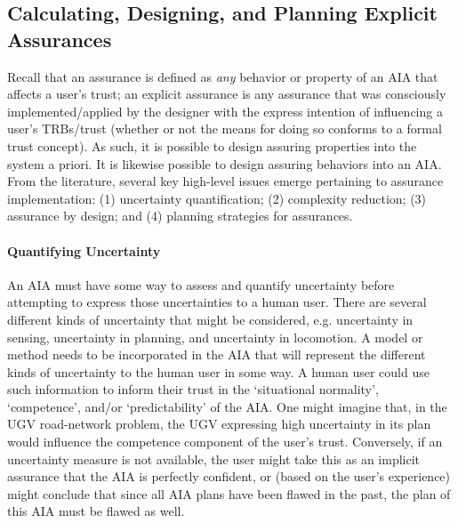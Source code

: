 \subsection{Calculating, Designing, and Planning Explicit Assurances}
    Recall that an assurance is defined as \emph{any} behavior or property of an AIA that affects a user's trust; an explicit assurance is any assurance that was consciously implemented/applied by the designer with the express intention of influencing a user's TRBs/trust (whether or not the means for doing so conforms to a formal trust concept). As such, it is possible to design assuring properties into the system a priori. It is likewise possible to design assuring behaviors into an AIA. From the literature, several key high-level issues emerge pertaining to assurance implementation: (1) uncertainty quantification; (2) complexity reduction; (3) assurance by design; and (4) planning strategies for assurances. 


    \paragraph{Quantifying Uncertainty} %
An AIA must have some way to assess and quantify uncertainty before attempting to express those uncertainties to a human user. 
There are several different kinds of uncertainty that might be considered, e.g. uncertainty in sensing, uncertainty in planning, and uncertainty in locomotion. 
A model or method needs to be incorporated in the AIA that will represent the different kinds of uncertainty to the human user in some way. 
A human user could use such information to inform their trust in the `situational normality', `competence', and/or `predictability' of the AIA. 
One might imagine that, in the UGV road-network problem, the UGV expressing high uncertainty in its plan would influence the competence component of the user's trust. Conversely, if an uncertainty measure is not available, the user might take this as an implicit assurance that the AIA is perfectly confident, or (based on the user's experience)  might conclude that since all AIA plans have been flawed in the past, the plan of this AIA must be flawed as well. 


